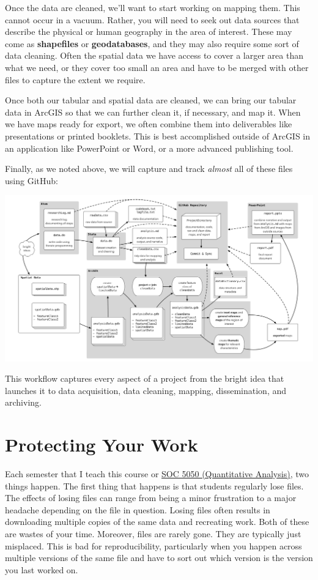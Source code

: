 \documentclass[]{book}
\theoremstyle{definition}
\theoremstyle{definition}
\theoremstyle{remark}
\begin{document}
Once the data are cleaned, we'll want to start working on mapping them.
This cannot occur in a vacuum. Rather, you will need to seek out data
sources that describe the physical or human geography in the area of
interest. These may come as \textbf{shapefiles} or
\textbf{geodatabases}, and they may also require some sort of data
cleaning. Often the spatial data we have access to cover a larger area
than what we need, or they cover too small an area and have to be merged
with other files to capture the extent we require.

Once both our tabular and spatial data are cleaned, we can bring our
tabular data in ArcGIS so that we can further clean it, if necessary,
and map it. When we have maps ready for export, we often combine them
into deliverables like presentations or printed booklets. This is best
accomplished outside of ArcGIS in an application like PowerPoint or
Word, or a more advanced publishing tool.

Finally, as we noted above, we will capture and track \emph{almost} all
of these files using GitHub:

\includegraphics[width=1\linewidth]{images/gisFlow2}

This workflow captures every aspect of a project from the bright idea
that launches it to data acquisition, data cleaning, mapping,
dissemination, and archiving.

\chapter{Protecting Your Work}\label{protecting-your-work}

Each semester that I teach this course or
\href{https://slu-soc5050.github.io}{SOC 5050 (Quantitative Analysis)},
two things happen. The first thing that happens is that students
regularly lose files. The effects of losing files can range from being a
minor frustration to a major headache depending on the file in question.
Losing files often results in downloading multiple copies of the same
data and recreating work. Both of these are wastes of your time.
Moreover, files are rarely gone. They are typically just misplaced. This
is bad for reproducibility, particularly when you happen across multiple
versions of the same file and have to sort out which version is the
version you last worked on.
\end{document}
